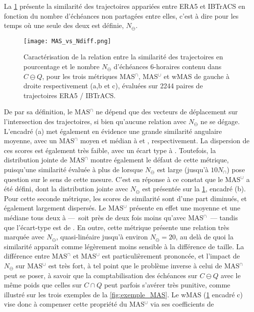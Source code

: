\documentclass[../main.tex]{subfiles}
\begin{document}
La \cref{fig:MAS_Ndiff} présente la similarité des trajectoires appariées entre ERA5 et IBTrACS en fonction du nombre d'échéances non partagées entre elles,
c'est à dire pour les temps où une seule des deux est définie, $N_\ominus$.
%
\begin{figure}[htpb]
    \centering
    \texttt{[image: MAS\_vs\_Ndiff.png]}
    \caption{Caractérisation de la relation entre la similarité des trajectoires en pourcentage et le nombre $N_\ominus$ d'échéances \num{6}-horaires contenu
    dans $C \ominus Q$, pour les trois métriques MAS$^\cap$, MAS$^\cup$ et wMAS de gauche à droite respectivement (a,b et c), évaluées sur \num{2244} paires de
    trajectoires ERA5 / IBTrACS.}
    \label{fig:MAS_Ndiff}
\end{figure}
%
De par sa définition, le MAS$^\cap$ ne dépend que des vecteurs de déplacement sur l'intersection des trajectoires, si bien qu'aucune relation avec $N_\ominus$
ne se dégage. L'encadré (a) met également en évidence une grande similarité angulaire moyenne, avec un MAS$^\cap$ moyen et médian à  et ,
respectivement. La dispersion de ces scores est également très faible, avec un écart type à . Toutefois, la distribution jointe de MAS$^\cap$ montre
également le défaut de cette métrique, puisqu'une similarité évaluée à plus de  lorsque $N_\ominus$ est large (jusqu'à $10 N_\cap$) pose question sur
le sens de cette mesure. C'est en réponse à ce constat que le MAS$^\cup$ a été défini, dont la distribution jointe avec $N_\ominus$ est présentée sur la
\cref{fig:MAS_Ndiff}, encadré (b). Pour cette seconde métrique, les scores de similarité sont d'une part diminués, et également largement dispersés. Le
MAS$^\cup$ présente en effet une moyenne et une médiane tous deux à  ---~soit près de deux fois moins qu'avec MAS$^\cap$~--- tandis que l'écart-type
est de . En outre, cette métrique présente une relation très marquée avec $N_\ominus$, quasi-linéaire jusqu'à environ $N_\ominus = 20$, au delà de quoi
la similarité apparaît comme légèrement moins sensible à la différence de taille. La différence entre MAS$^\cap$ et MAS$^\cup$ est particulièrement prononcée,
et l'impact de $N_\ominus$ sur MAS$^\cup$ est très fort, à tel point que le problème inverse à celui de MAS$^\cap$ peut se poser, à savoir que la
comptabilisation des échéances sur $C \ominus Q$ avec le même poids que celles sur $C \cap Q$ peut parfois s'avérer très punitive, comme illustré sur les trois
exemples de la \cref{fig:exemple_MAS}. Le wMAS (\cref{fig:MAS_Ndiff} encadré c) vise donc à compenser cette propriété du MAS$^\cup$ via ses coefficients de
\end{document}

